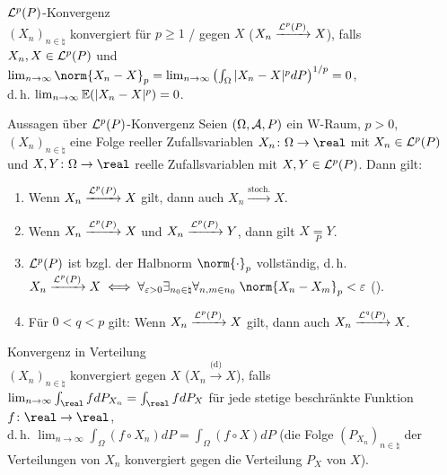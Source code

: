 \linie
\pagebreak

\begin{Def}{$\mathcal{L}^p(P)$-Konvergenz}\\
    $(X_n)_{n \in \natural}$ konvergiert für $p \ge 1$
    / gegen $X$
    ($X_n \xrightarrow{\mathcal{L}^p(P)} X$), falls\\
    $X_n, X \in \mathcal{L}^p(P)$ und
    $\lim_{n \to \infty} \norm{X_n - X}_p =
    \lim_{n \to \infty} \left(\int_\Omega |X_n - X|^p dP\right)^{1/p} = 0$,\\
    d.\,h. $\lim_{n \to \infty} \mathbb{E}(|X_n - X|^p) = 0$.
\end{Def}

\begin{Satz}{Aussagen über $\mathcal{L}^p(P)$-Konvergenz}
    Seien $(\Omega, \mathcal{A}, P)$ ein W-Raum, $p > 0$,
    $(X_n)_{n \in \natural}$ eine Folge reeller Zufallsvariablen
    $X_n\colon \Omega \rightarrow \real$ mit $X_n \in \mathcal{L}^p(P)$ und
    $X, Y\colon \Omega \rightarrow \real$ reelle Zufallsvariablen mit $X, Y \in \mathcal{L}^p(P)$.
    Dann gilt:
    \begin{enumerate}
        \item
        Wenn $X_n \xrightarrow{\mathcal{L}^p(P)} X$ gilt, dann auch
        $X_n \xrightarrow{\text{stoch.}} X$.

        \item
        Wenn $X_n \xrightarrow{\mathcal{L}^p(P)} X$ und $X_n \xrightarrow{\mathcal{L}^p(P)} Y$,
        dann gilt $X \underset{P}{=} Y$.

        \item
        $\mathcal{L}^p(P)$ ist bzgl. der Halbnorm $\norm{\cdot}_p$ vollständig, d.\,h.\\
        $X_n \xrightarrow{\L^p(P)} X
        \iff \forall_{\varepsilon > 0} \exists_{n_0 \in \natural} \forall_{n, m \in n_0}\;
        \norm{X_n - X_m}_p < \varepsilon$
        ().

        \item
        Für $0 < q < p$ gilt:
        Wenn $X_n \xrightarrow{\mathcal{L}^p(P)} X$ gilt, dann auch
        $X_n \xrightarrow{\mathcal{L}^q(P)} X$.
    \end{enumerate}
\end{Satz}

\linie

\begin{Def}{Konvergenz in Verteilung}\\
    $(X_n)_{n \in \natural}$ konvergiert  gegen $X$
    ($X_n \xrightarrow{\text{(d)}} X$), falls\\
    $\lim_{n \to \infty} \int_\real f dP_{X_n} = \int_\real f dP_X$ für jede
    stetige beschränkte Funktion $f\colon \real \rightarrow \real$,\\
    d.\,h. $\lim_{n \to \infty} \int_\Omega (f \circ X_n) dP = \int_\Omega (f \circ X) dP$
    (die Folge $(P_{X_n})_{n \in \natural}$ der Verteilungen von $X_n$ konvergiert
     gegen die Verteilung $P_X$ von $X$).
\end{Def}

